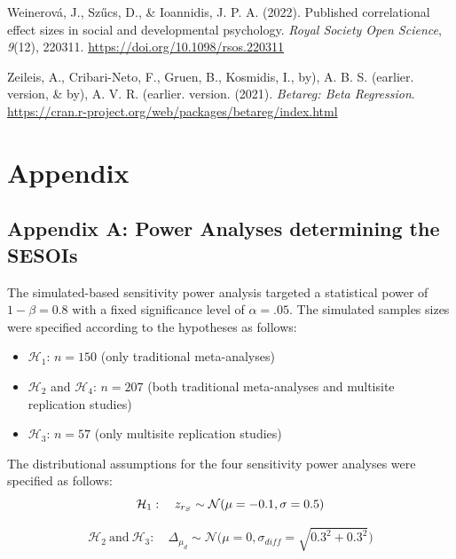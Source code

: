 \documentclass[
  12pt,
]{scrartcl}
\providecommand{\tightlist}{%
  \setlength{\itemsep}{0pt}\setlength{\parskip}{0pt}}\usepackage{longtable,booktabs,array}
\newlength{\cslhangindent}
\newenvironment{CSLReferences}[2] %
 {\begin{list}{}{%
  \setlength{\itemindent}{0pt}
  \setlength{\leftmargin}{0pt}
  \setlength{\parsep}{0pt}
  \ifodd #1
   \setlength{\leftmargin}{\cslhangindent}
   \setlength{\itemindent}{-1\cslhangindent}
  \fi
  \setlength{\itemsep}{#2\baselineskip}}}
 {\end{list}}
\begin{document}
\begin{CSLReferences}{1}{0}
Weinerová, J., Szűcs, D., \& Ioannidis, J. P. A. (2022). Published
correlational effect sizes in social and developmental psychology.
\emph{Royal Society Open Science}, \emph{9}(12), 220311.
\url{https://doi.org/10.1098/rsos.220311}

Zeileis, A., Cribari-Neto, F., Gruen, B., Kosmidis, I., by), A. B. S.
(earlier. version, \& by), A. V. R. (earlier. version. (2021).
\emph{Betareg: {Beta} {Regression}}.
\url{https://cran.r-project.org/web/packages/betareg/index.html}

\end{CSLReferences}

\newpage
\renewcommand{\thetable}{\Alph{section}\arabic{table}}

\section{Appendix}\label{appendix}

\subsection{Appendix A: Power Analyses determining the
SESOIs}\label{appendix-a-power-analyses-determining-the-sesois}

The simulated-based sensitivity power analysis targeted a statistical
power of \(1-\beta=0.8\) with a fixed significance level of
\(\alpha = .05\). The simulated samples sizes were specified according
to the hypotheses as follows:

\begin{itemize}
\tightlist
\item
  \(\mathcal{H}_1\): \(n = 150\) (only traditional meta-analyses)
\item
  \(\mathcal{H}_2\) and \(\mathcal{H}_4\): \(n = 207\) (both traditional
  meta-analyses and multisite replication studies)
\item
  \(\mathcal{H}_3\): \(n = 57\) (only multisite replication studies)
\end{itemize}

The distributional assumptions for the four sensitivity power analyses
were specified as follows: \[
\mathcal{H}_1: \quad z_{r_S} \sim \mathcal{N}(\mu=-0.1, \sigma=0.5) \\
\]

\[
\mathcal{H}_2 ~ \text{and} ~ \mathcal{H}_3: \quad \Delta_{\mu_d} \sim \mathcal{N}\Big(\mu=0, \sigma_{diff}=\sqrt{0.3^2+0.3^2}\Big) 
\]
\end{document}
